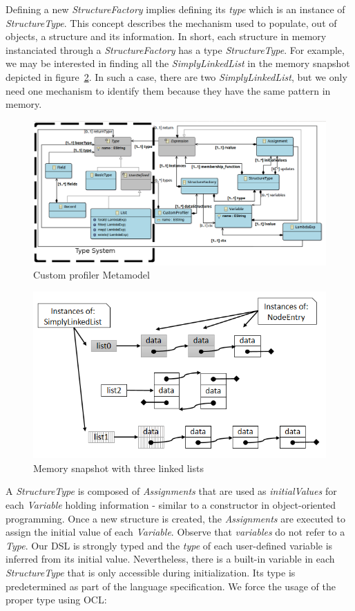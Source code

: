 Defining a new \textit{StructureFactory} implies defining its \textit{type} which is an instance of \textit{StructureType}.
This concept describes the mechanism used to populate, out of objects, a structure and its information.
In short, each structure in memory instanciated through a \textit{StructureFactory} has a type \textit{StructureType}.
For example, we may be interested in finding all the \textit{SimplyLinkedList} in the memory snapshot depicted in figure~\ref{fig:simple_snapshot}.
In such a case, there are two \textit{SimplyLinkedList}, but we only need one mechanism to identify them because they have the same pattern in memory. 

\begin{figure}
\centering
\includegraphics[width=0.87\linewidth]{chapter6/fig/AS}
\caption{Custom profiler Metamodel}
\label{fig:as}
\end{figure}

\begin{figure}
\centering
\includegraphics[width=0.87\linewidth]{chapter6/fig/lists}
\caption{Memory snapshot with three linked lists}
\label{fig:simple_snapshot}
\end{figure}

A \textit{StructureType} is composed of \textit{Assignments} that are used as \textit{initialValues} for each \textit{Variable} holding information - similar to a constructor in object-oriented programming.
Once a new structure is created, the \textit{Assignments} are executed to assign the initial value of each \textit{Variable}.
Observe that \textit{variables} do not refer to a \textit{Type}.
Our DSL is strongly typed and the \textit{type} of each user-defined variable is inferred from its initial value.
Nevertheless, there is a built-in variable in each \textit{StructureType} that is only accessible during initialization.
Its type is predetermined as part of the language specification.
We force the usage of the proper type using OCL:

